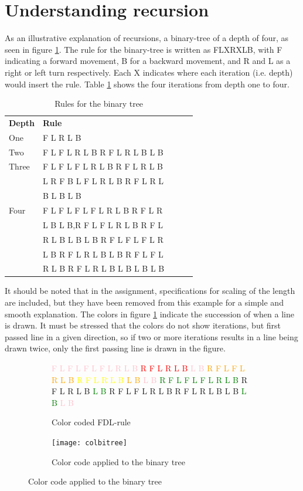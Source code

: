 \documentclass[titlepage]{article}
\newcommand{\pink}{\textcolor{pink}}
\newcommand{\red}{\textcolor{red}}
\newcommand{\orange}{\textcolor{orange}}
\newcommand{\yellow}{\textcolor{yellow}}
\newcommand{\green}{\textcolor{green}}
\newcommand{\lgreen}{\textcolor{lgreen}}
\newcommand{\dblue}{\textcolor{dblue}}
\newcommand{\lblue}{\textcolor{lblue}}
\begin{document}
\section{Understanding recursion}
As an illustrative explanation of recursions, a binary-tree of a depth of four, as seen in figure \ref{fig:coltree}. The rule for the binary-tree is written as FLXRXLB, with F indicating a forward movement, B for a backward movement, and R and L as a right or left turn respectively. Each X indicates where each iteration (i.e. depth) would insert the rule. Table \ref{table:binary}  shows the four iterations from depth one to four. 
\begin{table}[H]
\centering
\caption{Rules for the binary tree}
\label{table:binary}
\begin{tabular}{lllll}
  \textbf{Depth} & \textbf{Rule}\\
  One   & F L R L B \\
  Two   & F L F L R L B R F L R L B L B\\
  Three &F L F L F L R L B R F L R L B \\
        & L R F B L F L R L B R F L R L  \\
  &B L B L B\\
  Four  & F L F L F L F L R L B R F L R\\
   & L B L B,R F L F L R L B R F L\\
   & R L B L B L B R F L F L F L R\\
   & L B R F L R L B L B R F L F L\\
   & R L B R F L R L B L B L B L B\\
  \end{tabular}
\end{table}
It should be noted that in the assignment, specifications for scaling of the length are included, but they have been removed from this example for a simple and smooth explanation. The colors in figure \ref{fig:coltree} indicate the succession of when a line is drawn. It must be stressed that the colors do not show iterations, but first passed line in a given direction, so if two or more iterations results in a line being drawn twice, only the first passing line is drawn in the figure. \newline

\begin{figure}[H]
  \caption{Binary tree with depth 4}
  \centering
  \begin{subfigure}[b]{0.4\textwidth}
    \pink{F L F L F L F L R L B} \red{R F L R L B} \pink{L B} \orange{R F L F L R L B} \yellow{R F L R L B} \orange{L B} \pink{L B} \green{R F L F L F L R L B} \lgreen{R F L R L B} \green{L B} \dblue{R F L F L R L B} \lblue{R F L R L B} \dblue{L B} \green{L B} \pink{L B}
    \caption{Color coded FDL-rule}
  \end{subfigure}
  \begin{subfigure}[b]{0.5\textwidth}
    \texttt{[image: colbitree]}
    \caption{Color code applied to the binary tree}
  \end{subfigure}
  \label{fig:coltree}
  \addtocounter{figure}{-1}
\end{figure}
\end{document}
